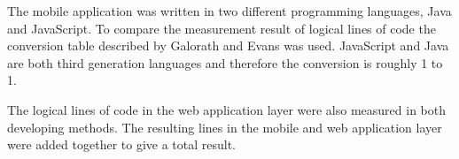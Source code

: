 The mobile application was written in two different programming languages, Java and JavaScript. To compare the measurement result of logical lines of code the conversion table described by Galorath and Evans \cite[p.~163]{galorath2006} was used. JavaScript and Java are both third generation languages and therefore the conversion is roughly 1 to 1. 

The logical lines of code in the web application layer were also measured in both developing methods. The resulting lines in the mobile and web application layer were added together to give a total result. 